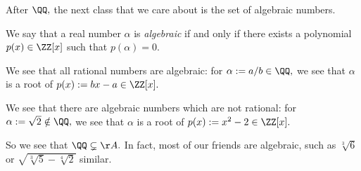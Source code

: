 After $\QQ,$ the next class that we care about is the set of algebraic numbers.
\begin{defi}[Algebraic]
	We say that a real number $\alpha$ is \textit{algebraic} if and only if there exists a polynomial $p(x)\in\ZZ[x]$ such that $p(\alpha)=0.$
\end{defi}
\begin{ex}
	We see that all rational numbers are algebraic: for $\alpha:=a/b\in\QQ,$ we see that $\alpha$ is a root of $p(x):=bx-a\in\ZZ[x].$
\end{ex}
\begin{ex}
	We see that there are algebraic numbers which are not rational: for $\alpha:=\sqrt2\notin\QQ,$ we see that $\alpha$ is a root of $p(x):=x^2-2\in\ZZ[x].$
\end{ex}
So we see that $\QQ\subsetneq\AA.$ In fact, most of our friends are algebraic, such as $\sqrt[3]6$ or $\sqrt{\sqrt[3]5-\sqrt[4]2}$ similar.

